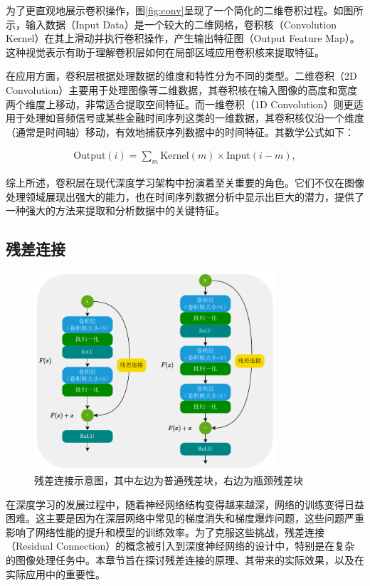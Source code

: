 为了更直观地展示卷积操作，图\ref{fig:conv}呈现了一个简化的二维卷积过程。如图所示，输入数据（Input Data）是一个较大的二维网格，卷积核（Convolution Kernel）在其上滑动并执行卷积操作，产生输出特征图（Output Feature Map）。这种视觉表示有助于理解卷积层如何在局部区域应用卷积核来提取特征。


在应用方面，卷积层根据处理数据的维度和特性分为不同的类型。二维卷积（2D Convolution）主要用于处理图像等二维数据，其卷积核在输入图像的高度和宽度两个维度上移动，非常适合提取空间特征。而一维卷积（1D Convolution）则更适用于处理如音频信号或某些金融时间序列这类的一维数据，其卷积核仅沿一个维度（通常是时间轴）移动，有效地捕获序列数据中的时间特征。其数学公式如下：

\begin{align}
    \text{Output}(i) = \sum_{m} \text{Kernel}(m) \times \text{Input}(i-m),
    \label{equ: onedconv}
\end{align}

综上所述，卷积层在现代深度学习架构中扮演着至关重要的角色。它们不仅在图像处理领域展现出强大的能力，也在时间序列数据分析中显示出巨大的潜力，提供了一种强大的方法来提取和分析数据中的关键特征。

\subsection{残差连接}\label{sec:background}

\begin{figure}
    \centering
    \includegraphics[width=0.8\textwidth]{Image/residualblock_cn.pdf}
    \caption{残差连接示意图，其中左边为普通残差块，右边为瓶颈残差块}
    \label{fig:residual}
\end{figure}

在深度学习的发展过程中，随着神经网络结构变得越来越深，网络的训练变得日益困难。这主要是因为在深层网络中常见的梯度消失和梯度爆炸问题，这些问题严重影响了网络性能的提升和模型的训练效率。为了克服这些挑战，残差连接（Residual Connection）的概念被引入到深度神经网络的设计中\cite{he2016deep}，特别是在复杂的图像处理任务中。本章节旨在探讨残差连接的原理、其带来的实际效果，以及在实际应用中的重要性。

